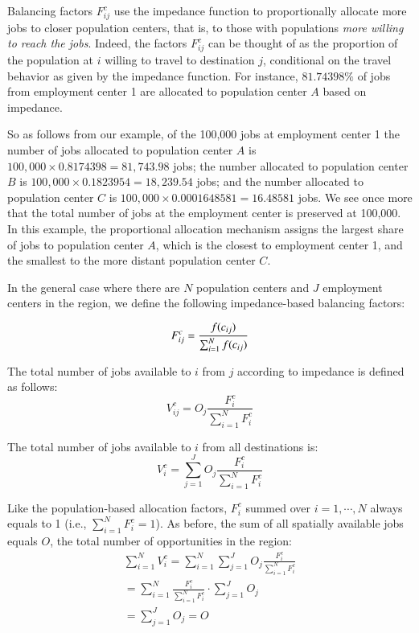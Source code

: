 \documentclass[]{elsarticle} %
\begin{document}
Balancing factors \(F^c_{ij}\) use the impedance function to
proportionally allocate more jobs to closer population centers, that is,
to those with populations \emph{more willing to reach the jobs}. Indeed,
the factors \(F^c_{ij}\) can be thought of as the proportion of the
population at \(i\) willing to travel to destination \(j\), conditional
on the travel behavior as given by the impedance function. For instance,
\({81.74398}\%\) of jobs from employment center 1 are allocated to
population center \(A\) based on impedance.

So as follows from our example, of the 100,000 jobs at employment center
1 the number of jobs allocated to population center \(A\) is
\(100,000\times 0.8174398 = 81,743.98\) jobs; the number allocated to
population center \(B\) is \(100,000\times 0.1823954 = 18,239.54\) jobs;
and the number allocated to population center \(C\) is
\(100,000\times 0.0001648581 = 16.48581\) jobs. We see once more that
the total number of jobs at the employment center is preserved at
100,000. In this example, the proportional allocation mechanism assigns
the largest share of jobs to population center \(A\), which is the
closest to employment center 1, and the smallest to the more distant
population center \(C\).

In the general case where there are \(N\) population centers and \(J\)
employment centers in the region, we define the following
impedance-based balancing factors:

\begin{equation}
\label{eq:impedance-balancing-factor}
F^c_{ij} = \frac{f(c_{ij})}{\sum_{i=1}^N f(c_{ij})}\\
\end{equation}

The total number of jobs available to \(i\) from \(j\) according to
impedance is defined as follows: \[
V^c_{ij} = O_j\frac{F^c_{i}}{\sum_{i=1}^N F^c_{i}}
\]

The total number of jobs available to \(i\) from all destinations is: \[
V^c_{i} = \sum_{j=1}^J O_j\frac{F^c_{i}}{\sum_{i=1}^N F^c_{i}}
\]

Like the population-based allocation factors, \(F^c_{i}\) summed over
\(i=1,\cdots,N\) always equals to 1 (i.e.,
\(\sum_{i=1}^{N} F^c_{i} = 1\)). As before, the sum of all spatially
available jobs equals \(O\), the total number of opportunities in the
region: \[
\begin{array}{l}
\sum_{i=1}^N V^c_i =\sum_{i=1}^N\sum_{j=1}^JO_j\frac{F^c_{i}}{\sum_{i=1}^N F^c_{i}}\\
=\sum_{i=1}^N \frac{F^c_{i}}{\sum_{i=1}^N F^c_{i}}\cdot\sum_{j=1}^JO_j\\
=\sum_{j=1}^J O_j = O
\end{array}
\]
\end{document}
